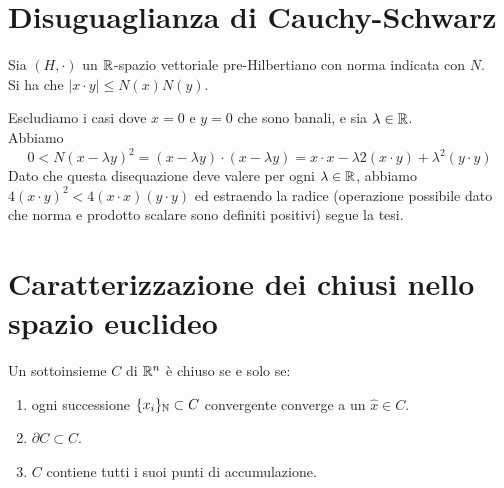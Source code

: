 \documentclass[openany]{book}
\begin{document}
\section{Disuguaglianza di Cauchy-Schwarz}

\begin{theorem}{}{}
    Sia $(H,\cdot)$ un $\mathbb{R}$-spazio vettoriale pre-Hilbertiano con norma indicata con $N$.\\ 
    Si ha che $|x \cdot y|\le N(x)N(y)$.
\end{theorem}

    Escludiamo i casi dove $x=0$ e $y=0$ che sono banali, e sia $\lambda \in \mathbb{R}$.\\
    Abbiamo \[0 < N(x-\lambda y)^2 = (x-\lambda y)\cdot (x-\lambda y) = x\cdot x - \lambda 2 (x\cdot y) + \lambda^2 (y\cdot y)\]
    Dato che questa disequazione deve valere per ogni $\lambda \in \mathbb{R}$, abbiamo $4(x\cdot y)^2 < 4(x\cdot x)(y\cdot y)$ ed estraendo la radice (operazione possibile dato che norma e prodotto scalare sono definiti positivi) segue la tesi.


\section{Caratterizzazione dei chiusi nello spazio euclideo}

\begin{theorem}{}{}
    Un sottoinsieme $C$ di $\mathbb{R}^n$ è chiuso se e solo se:\begin{enumerate}
        \item ogni successione $\{x_i\}_{\mathbb{N}} \subset C$ convergente converge a un $\hat{x} \in C$.
        \item $\partial C \subset C$.
        \item $C$ contiene tutti i suoi punti di accumulazione.
    \end{enumerate}
\end{theorem}
\end{document}
